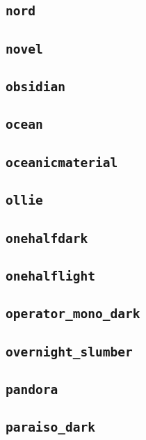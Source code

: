 \subsection{\texttt{nord}}
\newpage
\subsection{\texttt{novel}}
\newpage
\subsection{\texttt{obsidian}}
\newpage
\subsection{\texttt{ocean}}
\newpage
\subsection{\texttt{oceanicmaterial}}
\newpage
\subsection{\texttt{ollie}}
\newpage
\subsection{\texttt{onehalfdark}}
\newpage
\subsection{\texttt{onehalflight}}
\newpage
\subsection{\texttt{operator\_mono\_dark}}
\newpage
\subsection{\texttt{overnight\_slumber}}
\newpage
\subsection{\texttt{pandora}}
\newpage
\subsection{\texttt{paraiso\_dark}}
\newpage
